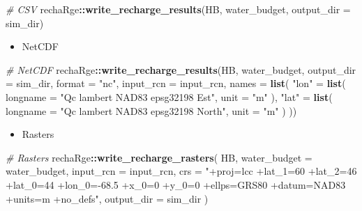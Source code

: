 \documentclass[
]{book}
\newenvironment{Shaded}{\begin{snugshade}}{\end{snugshade}}
\newcommand{\AttributeTok}[1]{\textcolor[rgb]{0.13,0.29,0.53}{#1}}
\newcommand{\CommentTok}[1]{\textcolor[rgb]{0.56,0.35,0.01}{\textit{#1}}}
\newcommand{\FunctionTok}[1]{\textcolor[rgb]{0.13,0.29,0.53}{\textbf{#1}}}
\newcommand{\NormalTok}[1]{#1}
\newcommand{\OtherTok}[1]{\textcolor[rgb]{0.56,0.35,0.01}{#1}}
\newcommand{\SpecialCharTok}[1]{\textcolor[rgb]{0.81,0.36,0.00}{\textbf{#1}}}
\newcommand{\StringTok}[1]{\textcolor[rgb]{0.31,0.60,0.02}{#1}}
\providecommand{\tightlist}{%
  \setlength{\itemsep}{0pt}\setlength{\parskip}{0pt}}
\begin{document}
\begin{Shaded}
\begin{Highlighting}[]
\CommentTok{\# CSV}
\NormalTok{rechaRge}\SpecialCharTok{::}\FunctionTok{write\_recharge\_results}\NormalTok{(HB, water\_budget, }\AttributeTok{output\_dir =}\NormalTok{ sim\_dir)}
\end{Highlighting}
\end{Shaded}

\begin{itemize}
\tightlist
\item
  NetCDF
\end{itemize}

\begin{Shaded}
\begin{Highlighting}[]
\CommentTok{\# NetCDF}
\NormalTok{rechaRge}\SpecialCharTok{::}\FunctionTok{write\_recharge\_results}\NormalTok{(HB, water\_budget, }\AttributeTok{output\_dir =}\NormalTok{ sim\_dir, }\AttributeTok{format =} \StringTok{"nc"}\NormalTok{, }\AttributeTok{input\_rcn =}\NormalTok{ input\_rcn, }\AttributeTok{names =} \FunctionTok{list}\NormalTok{(}
  \StringTok{"lon"} \OtherTok{=} \FunctionTok{list}\NormalTok{(}
    \AttributeTok{longname =} \StringTok{"Qc lambert NAD83 epsg32198 Est"}\NormalTok{,}
    \AttributeTok{unit =} \StringTok{"m"}
\NormalTok{  ),}
  \StringTok{"lat"} \OtherTok{=} \FunctionTok{list}\NormalTok{(}
    \AttributeTok{longname =} \StringTok{"Qc lambert NAD83 epsg32198 North"}\NormalTok{,}
    \AttributeTok{unit =} \StringTok{"m"}
\NormalTok{  )}
\NormalTok{))}
\end{Highlighting}
\end{Shaded}

\begin{itemize}
\tightlist
\item
  Rasters
\end{itemize}

\begin{Shaded}
\begin{Highlighting}[]
\CommentTok{\# Rasters}
\NormalTok{rechaRge}\SpecialCharTok{::}\FunctionTok{write\_recharge\_rasters}\NormalTok{(}
\NormalTok{  HB,}
  \AttributeTok{water\_budget =}\NormalTok{ water\_budget,}
  \AttributeTok{input\_rcn =}\NormalTok{ input\_rcn,}
  \AttributeTok{crs =} \StringTok{"+proj=lcc +lat\_1=60 +lat\_2=46 +lat\_0=44 +lon\_0={-}68.5 +x\_0=0 +y\_0=0 +ellps=GRS80 +datum=NAD83 +units=m +no\_defs"}\NormalTok{,}
  \AttributeTok{output\_dir =}\NormalTok{ sim\_dir}
\NormalTok{)}
\end{Highlighting}
\end{Shaded}
\end{document}
